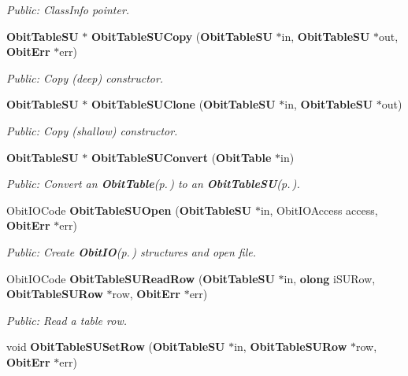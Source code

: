 \begin{CompactItemize}
\begin{CompactList}\small\item\em Public: Class\-Info pointer. \item\end{CompactList}\item 
{\bf Obit\-Table\-SU} $\ast$ {\bf Obit\-Table\-SUCopy} ({\bf Obit\-Table\-SU} $\ast$in, {\bf Obit\-Table\-SU} $\ast$out, {\bf Obit\-Err} $\ast$err)
\begin{CompactList}\small\item\em Public: Copy (deep) constructor. \item\end{CompactList}\item 
{\bf Obit\-Table\-SU} $\ast$ {\bf Obit\-Table\-SUClone} ({\bf Obit\-Table\-SU} $\ast$in, {\bf Obit\-Table\-SU} $\ast$out)
\begin{CompactList}\small\item\em Public: Copy (shallow) constructor. \item\end{CompactList}\item 
{\bf Obit\-Table\-SU} $\ast$ {\bf Obit\-Table\-SUConvert} ({\bf Obit\-Table} $\ast$in)
\begin{CompactList}\small\item\em Public: Convert an {\bf Obit\-Table}{\rm (p.\,\pageref{structObitTable})} to an {\bf Obit\-Table\-SU}{\rm (p.\,\pageref{structObitTableSU})}. \item\end{CompactList}\item 
Obit\-IOCode {\bf Obit\-Table\-SUOpen} ({\bf Obit\-Table\-SU} $\ast$in, Obit\-IOAccess access, {\bf Obit\-Err} $\ast$err)
\begin{CompactList}\small\item\em Public: Create {\bf Obit\-IO}{\rm (p.\,\pageref{structObitIO})} structures and open file. \item\end{CompactList}\item 
Obit\-IOCode {\bf Obit\-Table\-SURead\-Row} ({\bf Obit\-Table\-SU} $\ast$in, {\bf olong} i\-SURow, {\bf Obit\-Table\-SURow} $\ast$row, {\bf Obit\-Err} $\ast$err)
\begin{CompactList}\small\item\em Public: Read a table row. \item\end{CompactList}\item 
void {\bf Obit\-Table\-SUSet\-Row} ({\bf Obit\-Table\-SU} $\ast$in, {\bf Obit\-Table\-SURow} $\ast$row, {\bf Obit\-Err} $\ast$err)

\end{CompactItemize}
